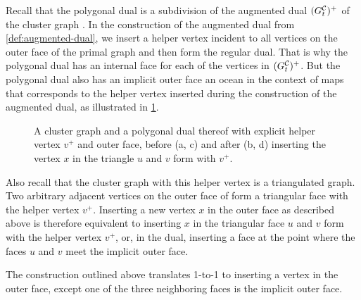 Recall that the polygonal dual is a subdivision of the augmented dual $(G^\mathcal{C}_{t})^+$ of the cluster graph .
In the construction of the augmented dual from \cref{def:augmented-dual}, we insert a helper vertex incident to all vertices on the outer face of the primal graph and then form the regular dual.
That is why the polygonal dual has an internal face for each of the vertices in $(G^\mathcal{C}_{t})^+$.
But the polygonal dual also has an implicit outer face \emdash{} an ocean in the context of maps \emdash{} that corresponds to the helper vertex inserted during the construction of the augmented dual, as illustrated in \cref{fig:insert-vertex-duality}.

\begin{figure}[H]
	\centering
	\quad
	\qquad
	\quad
	\caption{A cluster graph and a polygonal dual thereof with explicit helper vertex $v^+$ and outer face, before (a, c) and after (b, d) inserting the vertex $x$ in the triangle $u$ and $v$ form with $v^+$.}
	\label{fig:insert-vertex-duality}
\end{figure}

Also recall that the cluster graph with this helper vertex is a triangulated graph.
Two arbitrary adjacent vertices on the outer face of  form a triangular face with the helper vertex $v^+$.
Inserting a new vertex $x$ in the outer face as described above is therefore equivalent to inserting $x$ in the triangular face $u$ and $v$ form with the helper vertex $v^+$, or, in the dual, inserting a face at the point where the faces $u$ and $v$ meet the implicit outer face.

The construction outlined above translates 1-to-1 to inserting a vertex in the outer face, except one of the three neighboring faces is the implicit outer face.
